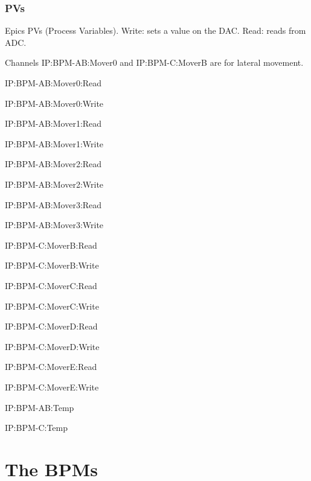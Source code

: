 \subsubsection{PVs}
Epics PVs (Process Variables). Write: sets a value on the DAC. Read: reads from ADC.\par
Channels IP:BPM-AB:Mover0 and IP:BPM-C:MoverB are for lateral movement.\par
IP:BPM-AB:Mover0:Read\par
IP:BPM-AB:Mover0:Write\par
IP:BPM-AB:Mover1:Read\par
IP:BPM-AB:Mover1:Write\par
IP:BPM-AB:Mover2:Read\par
IP:BPM-AB:Mover2:Write\par
IP:BPM-AB:Mover3:Read\par
IP:BPM-AB:Mover3:Write\par 
IP:BPM-C:MoverB:Read\par 
IP:BPM-C:MoverB:Write\par 
IP:BPM-C:MoverC:Read\par 
IP:BPM-C:MoverC:Write\par 
IP:BPM-C:MoverD:Read\par 
IP:BPM-C:MoverD:Write\par 
IP:BPM-C:MoverE:Read\par 
IP:BPM-C:MoverE:Write\par 
IP:BPM-AB:Temp\par 
IP:BPM-C:Temp\par 

\section{The BPMs}\label{s:BPMscoord}
